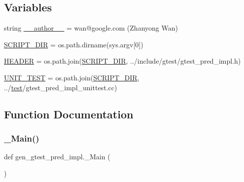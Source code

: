 \subsection*{Variables}
\begin{DoxyCompactItemize}
\item 
string \mbox{\hyperlink{namespacegen__gtest__pred__impl_af32e92d473ee6c427929cb7ddb4db7e6}{\+\_\+\+\_\+author\+\_\+\+\_\+}} = \textquotesingle{}wan@google.\+com (Zhanyong Wan)\textquotesingle{}
\item 
\mbox{\hyperlink{namespacegen__gtest__pred__impl_aed087c7fc787a064f0a9fd5f5f9f6487}{S\+C\+R\+I\+P\+T\+\_\+\+D\+IR}} = os.\+path.\+dirname(sys.\+argv\mbox{[}0\mbox{]})
\item 
\mbox{\hyperlink{namespacegen__gtest__pred__impl_ab96c63705e2cb7619876ba592dab4c8e}{H\+E\+A\+D\+ER}} = os.\+path.\+join(\mbox{\hyperlink{namespacegen__gtest__pred__impl_aed087c7fc787a064f0a9fd5f5f9f6487}{S\+C\+R\+I\+P\+T\+\_\+\+D\+IR}}, \textquotesingle{}../include/gtest/gtest\+\_\+pred\+\_\+impl.\+h\textquotesingle{})
\item 
\mbox{\hyperlink{namespacegen__gtest__pred__impl_a8c1cb8e87c4bd84edbb958f73b7df200}{U\+N\+I\+T\+\_\+\+T\+E\+ST}} = os.\+path.\+join(\mbox{\hyperlink{namespacegen__gtest__pred__impl_aed087c7fc787a064f0a9fd5f5f9f6487}{S\+C\+R\+I\+P\+T\+\_\+\+D\+IR}}, \textquotesingle{}../\mbox{\hyperlink{_mutual_8h_a707ee03719e99670bf6cfdfd897b8456}{test}}/gtest\+\_\+pred\+\_\+impl\+\_\+unittest.\+cc\textquotesingle{})
\end{DoxyCompactItemize}


\subsection{Function Documentation}
\mbox{\label{namespacegen__gtest__pred__impl_a50dd74615a1507ce657c8fa24d7c161e}} 
\subsubsection{\texorpdfstring{\_Main()}{\_Main()}}
{\footnotesize\ttfamily def gen\+\_\+gtest\+\_\+pred\+\_\+impl.\+\_\+\+Main (\begin{DoxyParamCaption}{ }\end{DoxyParamCaption})\hspace{0.3cm}{\ttfamily [private]}}

